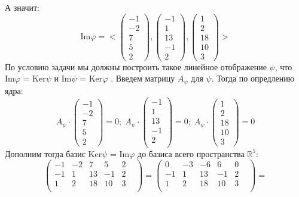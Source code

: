 \documentclass[a4paper,12pt]{article}
\begin{document}
А значит:
\[
\text{Im} \varphi = 
<
\left(\begin{matrix}
-1 \\
-2 \\
7 \\
5 \\
2
\end{matrix}\right)
,
\left(\begin{matrix}
-1 \\
1 \\
13 \\
-1 \\
2
\end{matrix}\right)
,
\left(\begin{matrix}
1 \\
2 \\
18 \\
10 \\
3
\end{matrix}\right)
>
\]
По условию задачи мы должны построить такое линейное отображение $\psi$, что $\text{Im} \varphi$ = $\text{Ker} \psi$ и $\text{Im} \psi$ = $\text{Ker} \varphi$ . Введем матрицу $A_{\psi}$ для $\psi$.  Тогда по опредлению ядра:
\[
A_{\psi}\cdot 
\left(\begin{matrix}
-1 \\
-2 \\
7 \\
5 \\
2
\end{matrix}\right)
= 0
; \;
A_{\psi}\cdot 
\left(\begin{matrix}
-1 \\
1\\
13\\
-1 \\
2 \\
\end{matrix}\right)
= 0
; \;
A_{\psi} \cdot 
\left(\begin{matrix}
1 \\
2 \\
18 \\
10 \\
3
\end{matrix}\right)
= 0
\]
Дополним тогда базис $\text{Ker} \psi$ = $\text{Im} \varphi$ до базиса всего пространства $\mathbb{R}^5$:
\[
\begin{pmatrix}
-1 & -2 & 7 & 5 & 2 & \\
-1 & 1 & 13 & -1 & 2 & \\
1 & 2 & 18 & 10 & 3 & \\
\end{pmatrix}
=
\begin{pmatrix}
0 & -3 & -6 & 6 & 0 & \\
-1 & 1 & 13 & -1 & 2 & \\
1 & 2 & 18 & 10 & 3 & \\
\end{pmatrix}
=
\]
\end{document}

